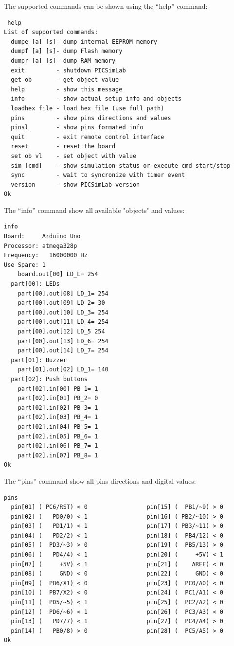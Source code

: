 The supported commands can be shown using the ``help'' command:  
\begin{verbatim}
 help
List of supported commands:
  dumpe [a] [s]- dump internal EEPROM memory
  dumpf [a] [s]- dump Flash memory
  dumpr [a] [s]- dump RAM memory
  exit         - shutdown PICSimLab
  get ob       - get object value
  help         - show this message
  info         - show actual setup info and objects
  loadhex file - load hex file (use full path)  
  pins         - show pins directions and values
  pinsl        - show pins formated info
  quit         - exit remote control interface
  reset        - reset the board
  set ob vl    - set object with value
  sim [cmd]    - show simulation status or execute cmd start/stop
  sync         - wait to syncronize with timer event
  version      - show PICSimLab version
Ok
\end{verbatim}
  

The ``info'' command show all available "objects" and values:
\begin{verbatim}
info
Board:     Arduino Uno
Processor: atmega328p
Frequency:   16000000 Hz
Use Spare: 1
    board.out[00] LD_L= 254
  part[00]: LEDs
    part[00].out[08] LD_1= 254
    part[00].out[09] LD_2= 30
    part[00].out[10] LD_3= 254
    part[00].out[11] LD_4= 254
    part[00].out[12] LD_5 254
    part[00].out[13] LD_6= 254
    part[00].out[14] LD_7= 254
  part[01]: Buzzer
    part[01].out[02] LD_1= 140
  part[02]: Push buttons
    part[02].in[00] PB_1= 1
    part[02].in[01] PB_2= 0
    part[02].in[02] PB_3= 1
    part[02].in[03] PB_4= 1
    part[02].in[04] PB_5= 1
    part[02].in[05] PB_6= 1
    part[02].in[06] PB_7= 1
    part[02].in[07] PB_8= 1
Ok
\end{verbatim}

The ``pins'' command show all pins directions and digital values:
\begin{verbatim}
pins
  pin[01] ( PC6/RST) < 0                 pin[15] (  PB1/~9) > 0 
  pin[02] (   PD0/0) < 1                 pin[16] ( PB2/~10) > 0 
  pin[03] (   PD1/1) < 1                 pin[17] ( PB3/~11) > 0 
  pin[04] (   PD2/2) < 1                 pin[18] (  PB4/12) < 0 
  pin[05] (  PD3/~3) > 0                 pin[19] (  PB5/13) > 0 
  pin[06] (   PD4/4) < 1                 pin[20] (     +5V) < 1 
  pin[07] (     +5V) < 1                 pin[21] (    AREF) < 0 
  pin[08] (     GND) < 0                 pin[22] (     GND) < 0 
  pin[09] (  PB6/X1) < 0                 pin[23] (  PC0/A0) < 0 
  pin[10] (  PB7/X2) < 0                 pin[24] (  PC1/A1) < 0 
  pin[11] (  PD5/~5) < 1                 pin[25] (  PC2/A2) < 0 
  pin[12] (  PD6/~6) < 1                 pin[26] (  PC3/A3) < 0 
  pin[13] (   PD7/7) < 1                 pin[27] (  PC4/A4) > 0 
  pin[14] (   PB0/8) > 0                 pin[28] (  PC5/A5) > 0 
Ok
\end{verbatim}

